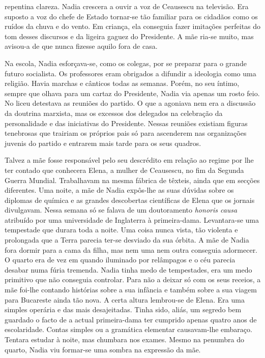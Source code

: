 repentina clareza. Nadia crescera a ouvir a voz de Ceausescu na
televisão. Era suposto a voz do chefe de Estado tornar-se tão familiar
para os cidadãos como os ruídos da chuva e do vento. Em criança, ela
conseguia fazer imitações perfeitas do tom desses discursos e da
ligeira gaguez
do Presidente. A mãe ria-se muito, mas avisou-a de que nunca fizesse
aquilo fora de casa.

Na escola, Nadia esforçava-se, como os colegas, por se preparar para o
grande futuro socialista. Os professores eram obrigados a difundir a
ideologia como uma religião. Havia marchas e cânticos todas as semanas.
Porém, no seu íntimo, sempre que olhava para um cartaz do Presidente,
Nadia via apenas um rosto feio. No liceu detestava as reuniões do
partido. O que a agoniava nem era a discussão da doutrina marxista, mas
os excessos dos delegados na celebração da personalidade e das
iniciativas do Presidente. Nessas reuniões existiam figuras tenebrosas
que trairiam os próprios pais só para ascenderem nas organizações
juvenis do partido e entrarem mais tarde para os seus quadros.

Talvez a mãe fosse responsável pelo seu descrédito em relação ao regime
por lhe ter contado que conhecera Elena, a mulher de Ceausescu, no fim
da Segunda Guerra Mundial. Trabalhavam na mesma fábrica de têxteis,
ainda que em secções diferentes. Uma noite, a mãe de Nadia expôs-lhe as
suas dúvidas sobre os diplomas de química e as grandes descobertas
científicas de Elena que os jornais divulgavam. Nessa semana só se
falava de um doutoramento \emph{honoris causa} atribuído por uma universidade de Inglaterra à
primeira-dama. Levantara-se uma tempestade que durara toda a noite. Uma
coisa nunca vista, tão violenta e prolongada que a Terra parecia
ter-se desviado da sua órbita. A mãe de Nadia fora dormir para a cama da
filha, mas nem uma nem outra conseguia adormecer. O quarto era de vez em
quando iluminado por relâmpagos e o céu parecia desabar numa fúria
tremenda. Nadia tinha medo de tempestades, era um medo primitivo que não conseguia controlar. Para não a
deixar só com os seus receios, a mãe foi-lhe contando histórias sobre a
sua infância e também sobre a sua viagem para Bucareste ainda tão nova.
A certa altura lembrou-se de Elena. Era uma simples operária e das mais
desajeitadas. Tinha sido, aliás, um segredo bem guardado o facto de a
actual primeira-dama ter cumprido apenas quatro anos de escolaridade.
Contas simples ou a gramática elementar causavam-lhe embaraço. Tentara
estudar à noite, mas chumbara nos exames. Mesmo na penumbra do quarto,
Nadia viu formar-se uma sombra na expressão da mãe.

